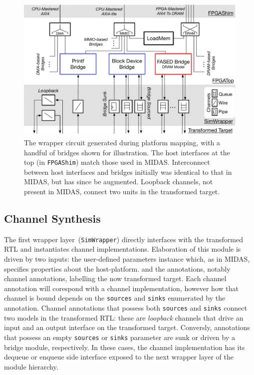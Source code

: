 \begin{figure}
  \centering
    \includegraphics[width=\columnwidth]{figures/sim-wrapper-layers.pdf}
    \caption{The wrapper circuit generated during platform mapping, with a handful of bridges shown for
    illustration. The host interfaces at the top (in \texttt{FPGAShim}) match those used in MIDAS. Interconnect
    between host interfaces and bridges initially was identical to that in MIDAS, but has since be augmented.
    Loopback channels, not present in MIDAS, connect two units in the transformed target.
    }
  \label{fig:sim-wrapper-layers}
\end{figure}


\subsection{Channel Synthesis}
The first wrapper layer~(\texttt{SimWrapper}) directly interfaces with the transformed RTL and instantiates
channel implementations. Elaboration of this module is driven by two inputs: the user-defined parameters instance
which, as in MIDAS, specifies properties about the host-platform. and the
annotations, notably channel annotations, labelling the now transformed target.
Each channel annotation will corespond with a channel implementation, however how that channel
is bound depends on the \texttt{sources} and \texttt{sinks} enumerated by the annotation.
Channel annotations that possess both \texttt{sources} and \texttt{sinks}
connect two models in the transformed RTL: these are \emph{loopback} channels
that drive an input and an output interface on the transformed target. Conversly,
annotations that possess an empty \texttt{sources} or \texttt{sinks} parameter
are sunk or driven by a bridge module, respectively. In these cases, the
channel implementation has its dequeue or enqueue side
interface exposed to the next wrapper layer of the module hierarchy.

